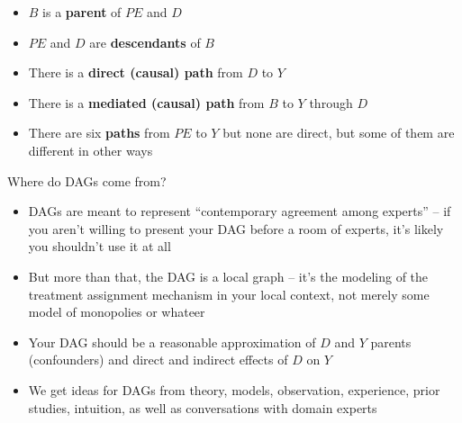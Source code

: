 \documentclass{beamer}
\begin{document}
\begin{frame}[plain]

  \begin{center}
  \end{center}

  \bigskip
  \begin{itemize}
    \item $B$ is a \textbf{parent} of $PE$ and $D$
    \item $PE$ and $D$ are \textbf{descendants} of $B$
    \item There is a \textbf{direct (causal) path} from $D$ to $Y$
    \item There is a \textbf{mediated (causal) path} from $B$ to $Y$ through $D$
    \item There are six \textbf{paths} from $PE$ to $Y$ but none are direct, but some of them are different in other ways
  \end{itemize}
\end{frame}





\begin{frame}{Where do DAGs come from?}

	\begin{itemize}
	\item DAGs are meant to represent ``contemporary agreement among experts'' -- if you aren't willing to present your DAG before a room of experts, it's likely you shouldn't use it at all
	\item But more than that, the DAG is a local graph -- it's the modeling of the treatment assignment mechanism in your local context, not merely some model of monopolies or whateer
	\item Your DAG should be a reasonable approximation of $D$ and $Y$ parents (confounders) and direct and indirect effects of $D$ on $Y$
	\item We get ideas for DAGs from theory, models, observation, experience, prior studies, intuition, as well as conversations with domain experts
	\end{itemize}

\end{frame}
\end{document}
